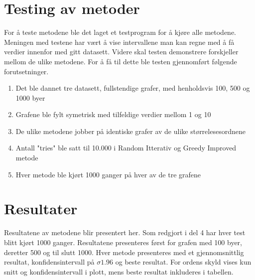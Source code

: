 \documentclass[12pt]{article}
\begin{document}
\section{Testing av metoder}
For å teste metodene ble det laget et testprogram for å kjøre alle metodene. Meningen med testene har vært å vise intervallene man kan regne med å få verdier innenfor med gitt datasett. Videre skal testen demonstrere forskjeller mellom de ulike metodene. For å få til dette ble testen gjennomført følgende forutsetninger.

\begin{enumerate}
\item{Det ble dannet tre datasett, fullstendige grafer, med henholdsvis 100, 500 og 1000 byer}
\item{Grafene ble fylt symetrisk med tilfeldige verdier mellom 1 og 10}
\item{De ulike metodene jobber på identiske grafer av de ulike størrelesesordnene}
\item{Antall "tries" ble satt til 10.000 i Random Itterativ og Greedy Improved metode}
\item{Hver metode ble kjørt 1000 ganger på hver av de tre grafene}
\end{enumerate}

\section{Resultater}
Resultatene av metodene blir presentert her. Som redgjort i del 4 har hver test blitt kjørt 1000 ganger. Resultatene presenteres først for grafen med 100 byer, deretter 500 og til slutt 1000. Hver metode presenteres med et gjennomsnittlig resultat, konfidensintervall på $\sigma 1.96$ og beste resultat. For ordens skyld vises kun snitt og konfidensintervall i plott, mens beste resultat inkluderes i tabellen. 
\end{document}
